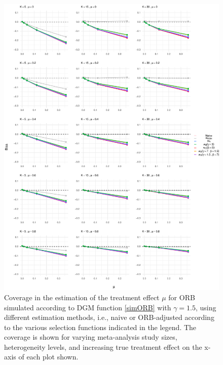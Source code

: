 \documentclass[twocolumn]{article}\usepackage[]{graphicx}\usepackage[]{xcolor}
\makeatletter
\def\maxwidth{ %
  \ifdim\Gin@nat@width>\linewidth
    \linewidth
  \else
    \Gin@nat@width
  \fi
}
\providecommand{\DIFaddbeginFL}{} %
\providecommand{\DIFaddendFL}{} %
\providecommand{\DIFdelbeginFL}{} %
\providecommand{\DIFdelendFL}{} %
\newcommand{\DIFscaledelfig}{0.5}
\newlength{\DIFdelgraphicswidth} %
\newlength{\DIFdelgraphicsheight} %
\newcommand{\DIFaddincludegraphics}[2][]{{\color{blue}\fbox{\DIFOincludegraphics[#1]{#2}}}} %
\newcommand{\DIFdelincludegraphics}[2][]{%
\sbox{\DIFdelgraphicsbox}{\DIFOincludegraphics[#1]{#2}}%
\settoboxwidth{\DIFdelgraphicswidth}{\DIFdelgraphicsbox} %
\settoboxtotalheight{\DIFdelgraphicsheight}{\DIFdelgraphicsbox} %
\scalebox{\DIFscaledelfig}{%
\parbox[b]{\DIFdelgraphicswidth}{\usebox{\DIFdelgraphicsbox}\\[-\baselineskip] \rule{\DIFdelgraphicswidth}{0em}}\llap{\resizebox{\DIFdelgraphicswidth}{\DIFdelgraphicsheight}{%
\setlength{\unitlength}{\DIFdelgraphicswidth}%
\begin{picture}(1,1)%
\thicklines\linethickness{2pt} %
{\color[rgb]{1,0,0}\put(0,0){\framebox(1,1){}}}%
{\color[rgb]{1,0,0}\put(0,0){\line( 1,1){1}}}%
{\color[rgb]{1,0,0}\put(0,1){\line(1,-1){1}}}%
\end{picture}%
}\hspace*{3pt}}} %
} %
\DeclareRobustCommand{\DIFaddbeginFL}{\DIFOaddbeginFL \let\includegraphics\DIFaddincludegraphics} %
\DeclareRobustCommand{\DIFaddendFL}{\DIFOaddendFL \let\includegraphics\DIFOincludegraphics} %
\DeclareRobustCommand{\DIFdelbeginFL}{\DIFOdelbeginFL \let\includegraphics\DIFdelincludegraphics} %
\DeclareRobustCommand{\DIFdelendFL}{\DIFOaddendFL \let\includegraphics\DIFOincludegraphics} %
\makeatother
\begin{document}



\begin{figure}[!hbt]
\centering
\caption{Coverage in the estimation of the treatment effect $\mu$ for ORB simulated according to DGM function \eqref{simORB} with $\gamma=1.5$, using different estimation methods, i.e., naive or ORB-adjusted according to the various selection functions indicated in the legend. The coverage is shown for varying meta-analysis study sizes, heterogeneity levels, and increasing true treatment effect on the x-axis of each plot shown.\\[0.5em]}


{\centering \DIFdelbeginFL %
\DIFdelendFL \DIFaddbeginFL \includegraphics[width=\maxwidth]{figures/plots-unnamed-chunk-7-1} 
\DIFaddendFL 

}



\label{Cov1}
\end{figure}
\end{document}
